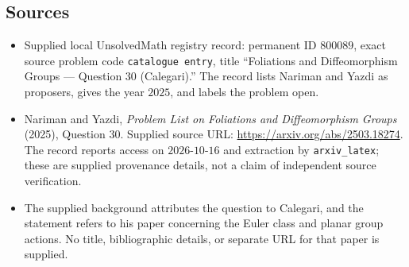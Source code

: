 \documentclass[11pt]{article}
\begin{document}
\subsection{Sources}
\begin{itemize}
\item Supplied local UnsolvedMath registry record: permanent ID \(800089\), exact source problem code \texttt{catalogue entry}, title ``Foliations and Diffeomorphism Groups --- Question 30 (Calegari).'' The record lists Nariman and Yazdi as proposers, gives the year \(2025\), and labels the problem open.
\item Nariman and Yazdi, \emph{Problem List on Foliations and Diffeomorphism Groups} (2025), Question 30. Supplied source URL: \url{https://arxiv.org/abs/2503.18274}. The record reports access on \(2026\text{-}10\text{-}16\) and extraction by \texttt{arxiv\_latex}; these are supplied provenance details, not a claim of independent source verification.
\item The supplied background attributes the question to Calegari, and the statement refers to his paper concerning the Euler class and planar group actions. No title, bibliographic details, or separate URL for that paper is supplied.
\end{itemize}
\end{document}
